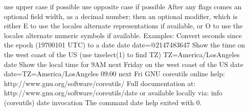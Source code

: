 \documentclass[letterpaper,12pt,english]{sphinxmanual}
\begin{document}
\begin{sphinxVerbatim}[commandchars=\\\{\}]
  \PYGZca{}  use upper case if possible
  \PYGZsh{}  use opposite case if possible
After any flags comes an optional field width, as a decimal number;
then an optional modifier, which is either
E to use the locale\PYGZsq{}s alternate representations if available, or
O to use the locale\PYGZsq{}s alternate numeric symbols if available.
Examples:
Convert seconds since the epoch (1970\PYGZhy{}01\PYGZhy{}01 UTC) to a date
  \PYGZdl{} date \PYGZhy{}\PYGZhy{}date=\PYGZsq{}@2147483647\PYGZsq{}
Show the time on the west coast of the US (use tzselect(1) to find TZ)
  \PYGZdl{} TZ=\PYGZsq{}America/Los\PYGZus{}Angeles\PYGZsq{} date
Show the local time for 9AM next Friday on the west coast of the US
  \PYGZdl{} date \PYGZhy{}\PYGZhy{}date=\PYGZsq{}TZ=\PYGZdq{}America/Los\PYGZus{}Angeles\PYGZdq{} 09:00 next Fri\PYGZsq{}
GNU coreutils online help: \PYGZlt{}http://www.gnu.org/software/coreutils/\PYGZgt{}
Full documentation at: \PYGZlt{}http://www.gnu.org/software/coreutils/date\PYGZgt{}
or available locally via: info \PYGZsq{}(coreutils) date invocation\PYGZsq{}
The command \PYGZdq{}date \PYGZhy{}\PYGZhy{}help\PYGZdq{} exited with 0.
\end{sphinxVerbatim}
\end{document}
